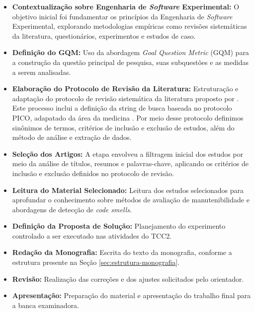 \begin{itemize}
    \item \textbf{Contextualização sobre Engenharia de \textit{Software} Experimental:} O objetivo inicial foi fundamentar os princípios da Engenharia de \textit{Software} Experimental, explorando metodologias empíricas como revisões sistemáticas da literatura, questionários, experimentos e estudos de caso. \cite{Wohlin:2012:ESE:2349018} \cite{yin2015estudo} \cite{Runeson2009}
    \item \textbf{Definição do GQM:} Uso da abordagem \textit{Goal Question Metric} (GQM) \cite{Basili1994} para a construção da questão principal de pesquisa, suas subquestões e as medidas a serem analisadas.
    \item \textbf{Elaboração do Protocolo de Revisão da Literatura:} Estruturação e adaptação do protocolo de revisão sistemática da literatura proposto por . Este processo inclui a definição da string de busca baseada no protocolo PICO, adapatado da área da medicina \cite{pai_clinical_2004}. Por meio desse protocolo definimos sinônimos de termos, critérios de inclusão e exclusão de estudos, além do método de análise  e  extração de dados.
    \item \textbf{Seleção dos Artigos:} A etapa envolveu a filtragem inicial dos estudos por meio da análise de títulos, resumos e palavras-chave, aplicando os critérios de inclusão e exclusão definidos no protocolo de revisão.
    \item \textbf{Leitura do Material Selecionado:} Leitura dos estudos selecionados para aprofundar o conhecimento sobre métodos de avaliação de manutenibilidade e abordagens de detecção de \textit{code smells}.
    \item \textbf{Definição da Proposta de Solução:} Planejamento do experimento controlado a ser executado nas atividades do TCC2.
    \item \textbf{Redação da Monografia:} Escrita do texto da monografia, conforme a estrutura presente na Seção \ref{sec:estrutura-monografia}.
    \item \textbf{Revisão:} Realização das correções e dos ajustes solicitados pelo orientador.
    \item \textbf{Apresentação:} Preparação do material e apresentação do trabalho final para a banca examinadora.
\end{itemize}